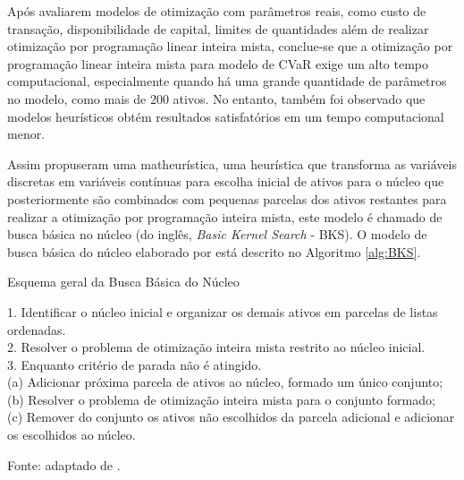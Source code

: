                     \ipar Após  avaliarem modelos de otimização com parâmetros reais, como custo de transação, disponibilidade de capital, limites de quantidades além de realizar otimização por programação linear inteira mista, conclue-se que a otimização por programação linear inteira mista para modelo de CVaR exige um alto tempo computacional, especialmente quando há uma grande quantidade de parâmetros no modelo, como mais de 200 ativos. No entanto, também foi observado que modelos heurísticos obtém resultados satisfatórios em um tempo computacional menor.
                
                    \ipar Assim propuseram uma matheurística, uma heurística que transforma as variáveis discretas em variáveis contínuas para escolha inicial de ativos para o núcleo que posteriormente são combinados com pequenas parcelas dos ativos restantes para realizar a otimização por programação inteira mista, este modelo é chamado de busca básica no núcleo (do inglês, \textit{Basic Kernel Search} - BKS). O modelo de busca básica do núcleo elaborado por  está descrito no Algoritmo \ref{alg:BKS}.
                
                    \begin{algorithm}
                        \caption{Esquema geral da Busca Básica do Núcleo}
                        \label{alg:BKS}
                        1. Identificar o núcleo inicial e organizar os demais ativos em parcelas de listas ordenadas. \\
                        2. Resolver o problema de otimização inteira mista restrito ao núcleo inicial. \\
                        3. Enquanto critério de parada não é atingido. \\
                            (a) Adicionar próxima parcela de ativos ao núcleo, formado um único conjunto; \\
                            (b) Resolver o problema de otimização inteira mista para o conjunto formado; \\
                            (c) Remover do conjunto os ativos não escolhidos da parcela adicional e adicionar os escolhidos ao núcleo. 
                        \par \footnotesize Fonte: adaptado de . %
                        \end{algorithm}
                
